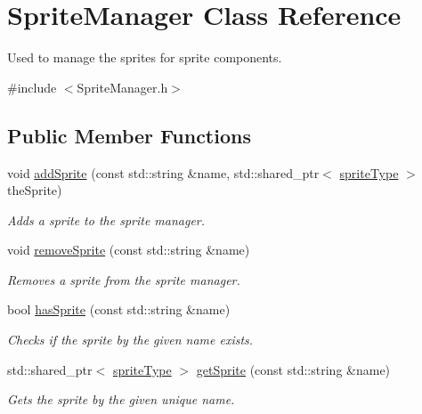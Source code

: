 \hypertarget{class_sprite_manager}{\section{Sprite\-Manager Class Reference}
\label{d2/ddd/class_sprite_manager}
}


Used to manage the sprites for sprite components.  




{\ttfamily \#include $<$Sprite\-Manager.\-h$>$}

\subsection*{Public Member Functions}
\begin{DoxyCompactItemize}
\item 
void \hyperlink{class_sprite_manager_ae7fbcf7339802c90557637b5efa87b78}{add\-Sprite} (const std\-::string \&name, std\-::shared\-\_\-ptr$<$ \hyperlink{_sprite_manager_8h_ae9a8a87b3b59b367a6567a36dbd96222}{sprite\-Type} $>$ the\-Sprite)
\begin{DoxyCompactList}\small\item\em Adds a sprite to the sprite manager. \end{DoxyCompactList}\item 
void \hyperlink{class_sprite_manager_af23d8d0946cf4f3be858a62f651adb28}{remove\-Sprite} (const std\-::string \&name)
\begin{DoxyCompactList}\small\item\em Removes a sprite from the sprite manager. \end{DoxyCompactList}\item 
bool \hyperlink{class_sprite_manager_a0b181cc3cec5eff62881911772e73a1a}{has\-Sprite} (const std\-::string \&name)
\begin{DoxyCompactList}\small\item\em Checks if the sprite by the given name exists. \end{DoxyCompactList}\item 
std\-::shared\-\_\-ptr$<$ \hyperlink{_sprite_manager_8h_ae9a8a87b3b59b367a6567a36dbd96222}{sprite\-Type} $>$ \hyperlink{class_sprite_manager_a8473bca1fad87ad11cb2249eb810889e}{get\-Sprite} (const std\-::string \&name)
\begin{DoxyCompactList}\small\item\em Gets the sprite by the given unique name. \end{DoxyCompactList}\end{DoxyCompactItemize}
